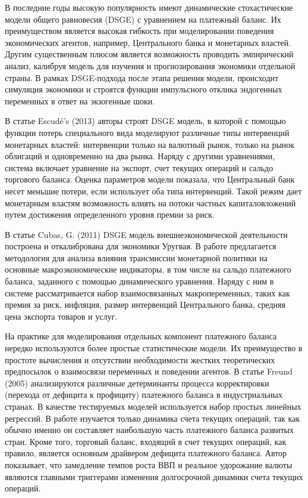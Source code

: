 \documentclass[a4paper, 14pt]{extarticle}
\begin{document}
В последние годы высокую популярность имеют динамические стохастические модели общего равновесия (DSGE) с уравнением на платежный баланс.
Их преимуществом является высокая гибкость при моделировании поведения экономических агентов, например, Центрального банка и монетарных властей.
Другим существенным плюсом является возможность проводить эмпирический анализ, калибруя модель для изучения и прогнозирования экономики отдельной страны. 
В рамках DSGE-подхода после этапа решения модели, происходит симуляция экономики и строятся функции импульсного отклика эндогенных переменных в ответ на экзогенные шоки.

В статье Escudé’s (2013) \autocite{escude2013dsge} авторы строят DSGE модель, в которой с помощью функции потерь специального вида моделируют различные типы интервенций монетарных властей: интервенции только на валютный рынок, только на рынок облигаций и одновременно на два рынка. 
Наряду с другими уравнениями, система включает уравнение на экспорт, счет текущих операций и сальдо торгового баланса. 
Оценка параметров модели показала, что Центральный банк несет меньшие потери, если использует оба типа интервенций. 
Такой режим дает монетарным властям возможность влиять на потоки частных капиталовложений путем достижения определенного уровня премии за риск.

В статье Cubas, G. (2011) \autocite{cubas2011dynamic} DSGE модель внешнеэкономической деятельности построена и откалибрована для экономики Уругвая. 
В работе предлагается методология для анализа влияния трансмиссии монетарной политики на основные макроэкономические индикаторы, в том числе на сальдо платежного баланса, заданного с помощью динамического уравнения. 
Наряду с ним в системе рассматривается набор взаимосвязанных макропеременных, таких как премия за риск, инфляция, размер интервенций Центрального банка, средняя цена экспорта товаров и услуг.

На практике для моделирования отдельных компонент платежного баланса нередко используются более простые статистические модели.
Их преимущество в простоте вычисления и отсутствии необходимости жестких теоретических предпосылок о взаимосвязи переменных и поведении агентов.
В статье Freund (2005) \autocite{freund2005current} анализируются различные детерминанты процесса корректировки (перехода от дефицита к профициту) платежного баланса в индустриальных странах. 
В качестве тестируемых моделей используется набор простых линейных регрессий.
В работе изучается только динамика счета текущих операций, так как обычно именно он составляет наибольшую часть платежного баланса развитых стран. 
Кроме того, торговый баланс, входящий в счет текущих операций, как правило, является основным драйвером дефицита платежного баланса.
Автор показывает, что замедление темпов роста ВВП и реальное удорожание валюты являются главными триггерами изменения долгосрочной динамики счета текущих операций.  
\end{document}
